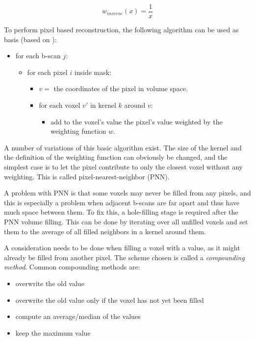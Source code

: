 	\begin{equation}
		w_{inverse}(x) = \frac{1}{x}
		\label{eq:inverse}
	\end{equation}
	
	To perform pixel based reconstruction, the following algorithm can be used as basis (based on \cite{solberg2007}):
	
	\begin{itemize}
		\item for each b-scan $j$:
		\begin{itemize}
			\item for each pixel $i$ inside mask:
			\begin{itemize}
				\item $v =$ the coordinates of the pixel in volume space.
				\item for each voxel $v'$ in kernel $k$ around $v$:
				\begin{itemize}
					\item add to the voxel's value the pixel's value weighted by the weighting function $w$.
				\end{itemize}
			\end{itemize}
		\end{itemize}
	\end{itemize}
	
	A number of variations of this basic algorithm exist. The size of the kernel and the definition of the weighting function can obviously be changed, and the simplest case is to let the pixel contribute to only the closest voxel without any weighting. This is called pixel-nearest-neighbor (PNN).
	
	A problem with PNN is that some voxels may never be filled from any pixels, and this is especially a problem when adjacent b-scans are far apart and thus have much space between them. To fix this, a hole-filling stage is required after the PNN volume filling. This can be done by iterating over all unfilled voxels and set them to the average of all filled neighbors in a kernel around them.
	
	A consideration needs to be done when filling a voxel with a value, as it might already be filled from another pixel. The scheme chosen is called a \emph{compounding method}. Common compounding methods are:
	
	\begin{itemize} 
		\item overwrite the old value
		\item overwrite the old value only if the voxel has not yet been filled
		\item compute an average/median of the values
		\item keep the maximum value
	\end{itemize}
	

